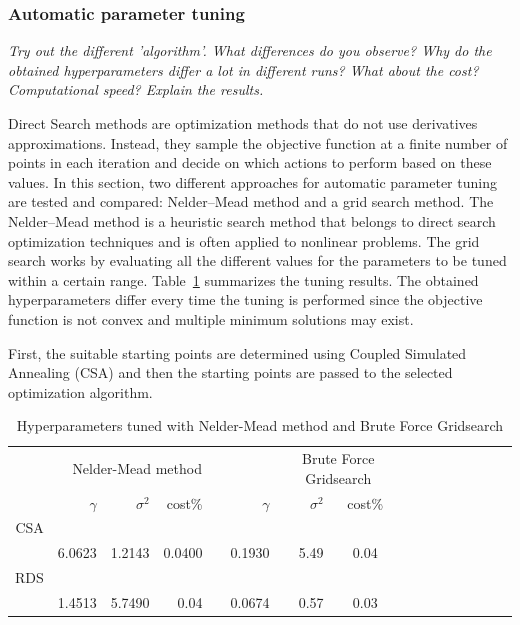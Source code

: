 \documentclass{article}
\newcommand{\ra}[1]{\renewcommand{\arraystretch}{#1}}
\begin{document}
\subsubsection{Automatic parameter tuning}
\textit{Try out the different 'algorithm'. What differences do you observe? Why do the
obtained hyperparameters differ a lot in different runs? What about the cost? Computational speed? Explain the results.}

Direct Search methods are optimization methods that do not use derivatives approximations. Instead, they sample the objective function at a finite number of points in each iteration and decide on which actions to perform based on these values. In this section, two different approaches for automatic parameter tuning are tested and compared: Nelder–Mead method and a grid search method.  The Nelder–Mead method is a heuristic search method that belongs to direct search optimization techniques and is often applied to nonlinear problems. The grid search works by evaluating all the different values for the parameters to be tuned within a certain range. Table~\ref{fig:tune1} summarizes the tuning results. The obtained hyperparameters differ every time the tuning is performed since the objective function is not convex and multiple minimum solutions may exist.

 

 First, the suitable starting points are determined using Coupled Simulated Annealing (CSA) and then the starting points are passed to the selected optimization algorithm.





\begin{table}\centering
\ra{1.3}
\begin{tabular}{@{}rrrrrrrccrrrcrrr@{}}\toprule
& \multicolumn{4}{c}{Nelder-Mead method} & \phantom{abc}& \multicolumn{2}{c}{Brute Force Gridsearch} &
\phantom{abc} \\
\cmidrule{2-5} \cmidrule{7-9} \cmidrule{10-12}
& $\gamma$ & $\sigma^2$ &     cost\% &&  $\gamma$ & $\sigma^2$ &    cost\% \\ \midrule
CSA\\
 &  6.0623 & 1.2143 &  0.0400 && 0.1930 & 5.49 & 0.04 \\

RDS\\
 &   1.4513 & 5.7490& 0.04 &&  0.0674 & 0.57 &0.03 && \\



\bottomrule
\end{tabular}
\caption{Hyperparameters tuned with Nelder-Mead method and Brute Force Gridsearch }
       \label{fig:tune1}
\end{table}
\end{document}
